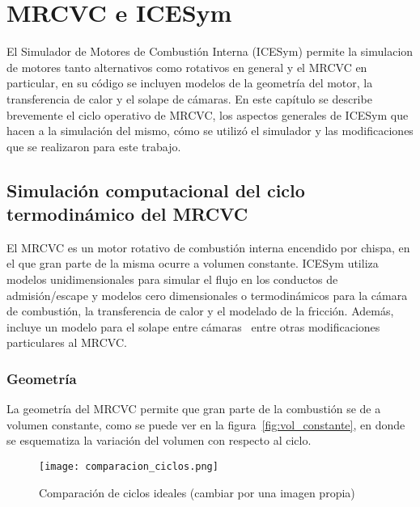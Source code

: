 \chapter{MRCVC e ICESym}

El Simulador de Motores de Combustión Interna (ICESym) permite la simulacion de
motores tanto alternativos como rotativos en general y el MRCVC en particular,
en su código se incluyen modelos de la geometría del motor, la transferencia de
calor y el solape de cámaras.
%
En este capítulo se describe brevemente el ciclo operativo de MRCVC, los
aspectos generales de ICESym que hacen a la simulación del mismo, cómo se
utilizó el simulador y las modificaciones que se realizaron para este trabajo.

\section{Simulación computacional del ciclo termodinámico del MRCVC}

El MRCVC es un motor rotativo de combustión interna encendido por chispa, en el
que gran parte de la misma ocurre a volumen constante.
%
ICESym utiliza modelos unidimensionales para simular el flujo en los conductos
de admisión/escape y modelos cero dimensionales o termodinámicos para la cámara
de combustión, la transferencia de calor y el modelado de la fricción.
%
Además, incluye un modelo para el solape entre cámaras~\cite{lopez16} entre
otras modificaciones particulares al MRCVC.\@

%

\subsection{Geometría}
%
La geometría del MRCVC permite que gran parte de la combustión se de a volumen
constante\cite{mrcvc_geom}, como se puede ver en la figura~\ref{fig:vol_constante},
en donde se esquematiza la variación del volumen con respecto al ciclo.

\begin{figure}
    \centering
    \texttt{[image: comparacion\_ciclos.png]}
    \caption{Comparación de ciclos ideales (cambiar por una imagen propia)}\label{fig:comparacion_ciclos}
\end{figure}


